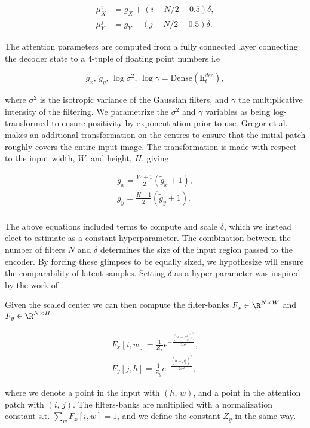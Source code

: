  \begin{align}
 \mu_X^i &= g_X + (i - N/2-0.5)\delta, \\
 \mu_Y^j &= g_Y + (j - N/2-0.5)\delta.
 \end{align}

\noindent The attention parameters are computed from a fully connected layer connecting the decoder state to a 4-tuple of floating point numbers i.e

\begin{equation}\label{eq:draw_params}
\tilde{g}_x, \,\tilde{g}_y, \, \log \sigma^2, \, \log \gamma = \text{Dense} (\mathbf{h}_t^{dec}),
\end{equation}

\noindent where $\sigma^2$ is the isotropic variance of the Gaussian filters, and $\gamma$ the multiplicative intensity of the filtering. We parametrize the $\sigma^2$ and $\gamma$ variables as being log-transformed to ensure positivity by exponentiation prior to use. Gregor et al. makes an additional transformation on the centres to ensure that the initial patch roughly covers the entire input image. The transformation is made with respect to the input width, $W$, and height, $H$, giving

\begin{align}
g_x = \frac{W +1 }{2} (\tilde{g}_x +1 ), \\
g_y = \frac{H +1 }{2} (\tilde{g}_y +1 ). \\
\end{align}

\noindent The above equations included terms to compute and scale $\delta$, which we instead elect to estimate as a constant hyperparameter. The combination between the number of filters $N$ and $\delta$ determines the size of the input region passed to the encoder. By forcing these glimpses to be equally sized, we hypothesize will ensure the comparability of latent samples. Setting $\delta$ as a hyper-parameter was inspired by the work of \citet{Harris2019}.

Given the scaled center we can then compute the filter-banks $F_x \in \R^{N \times W}$ and $F_y \in \R^{N \times H}$

\begin{align}
F_x [i, w] = \frac{1}{Z_x}e^{-\frac{(w - \mu_x^i)^2}{2\sigma^2}},\label{eq:Fx} \\
F_y [j, h] = \frac{1}{Z_y}e^{-\frac{(h - \mu_y^j)^2}{2\sigma^2}},\label{eq:Fy}
\end{align}

\noindent where we denote a point in the input with $(h,\, w)$, and a point in the attention patch with $(i,\, j)$. The filters-banks are multiplied with a normalization constant s.t. $\sum_w F_x[i, w] = 1$, and we define the constant $Z_y$ in the same way. 

